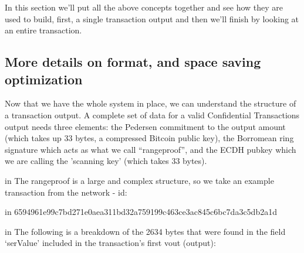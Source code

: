 \documentclass[10pt,a4paper]{article}
\begin{document}
In this section we'll put all the above concepts together and see how they are used to build, first, a single transaction output and then we'll finish by looking at an entire transaction.

\subsection{More details on format, and space saving optimization}

Now that we have the whole system in place, we can understand the structure of a transaction output. A complete set of data for a valid Confidential Transactions output needs three elements: the Pedersen commitment to the output amount (which takes up 33 bytes, a compressed Bitcoin public key), the Borromean ring signature which acts as what we call ``rangeproof'', and the ECDH pubkey which we are calling the 'scanning key' (which takes 33 bytes).

 in \noindent The rangeproof is a large and complex structure, so we take an example transaction from the network - id:

 in \noindent 6594961e99c7bd271e0aea311bd32a759199c463ce3ac845c6bc7da3c5db2a1d

 in \noindent The following is a breakdown of the 2634 bytes that were found in the field `serValue' included in the transaction's first vout (output):
\end{document}
